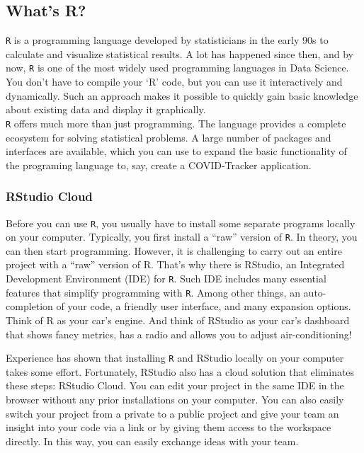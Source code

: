 \documentclass[
  11pt,
]{article}
\begin{document}
\hypertarget{whats-r}{%
\subsection{What's R?}\label{whats-r}}

\texttt{R} is a programming language developed by statisticians in the early 90s to calculate and visualize statistical results. A lot has happened since then, and by now, \texttt{R} is one of the most widely used programming languages in Data Science. You don't have to compile your `R' code, but you can use it interactively and dynamically. Such an approach makes it possible to quickly gain basic knowledge about existing data and display it graphically.\\
\texttt{R} offers much more than just programming. The language provides a complete ecosystem for solving statistical problems. A large number of packages and interfaces are available, which you can use to expand the basic functionality of the programing language to, say, create a COVID-Tracker application.

\hypertarget{rstudio-cloud}{%
\subsubsection{RStudio Cloud}\label{rstudio-cloud}}

Before you can use \texttt{R}, you usually have to install some separate programs locally on your computer. Typically, you first install a ``raw'' version of \texttt{R}. In theory, you can then start programming. However, it is challenging to carry out an entire project with a ``raw'' version of R. That's why there is RStudio, an Integrated Development Environment (IDE) for \texttt{R}. Such IDE includes many essential features that simplify programming with \texttt{R}. Among other things, an auto-completion of your code, a friendly user interface, and many expansion options. Think of R as your car's engine. And think of RStudio as your car's dashboard that shows fancy metrics, has a radio and allows you to adjust air-conditioning!

Experience has shown that installing \texttt{R} and RStudio locally on your computer takes some effort. Fortunately, RStudio also has a cloud solution that eliminates these steps: RStudio Cloud. You can edit your project in the same IDE in the browser without any prior installations on your computer. You can also easily switch your project from a private to a public project and give your team an insight into your code via a link or by giving them access to the workspace directly. In this way, you can easily exchange ideas with your team.
\end{document}
